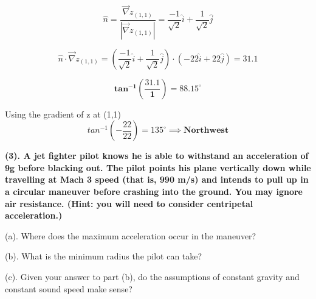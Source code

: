 \documentclass[12pt]{article}
\begin{document}
$$
\hat{n} = \frac{\vec{\nabla}z_{(1,1)}}{|\vec{\nabla}z_{(1,1)}|} = \frac{-1}{\sqrt{2}}\hat{i} + \frac{1}{\sqrt{2}}\hat{j}
$$

$$
\hat{n} \cdot \vec{\nabla}z_{(1,1)} = (\frac{-1}{\sqrt{2}}\hat{i} + \frac{1}{\sqrt{2}}\hat{j}) \cdot (-22\hat{i} + 22\hat{j}) = 31.1
$$


$$
\boldsymbol{tan^{-1}(\frac{31.1}{1}) = 88.15^{\circ}}
$$

Using the gradient of z at (1,1)
$$
tan^{-1}(-\frac{22}{22}) = 135^{\circ} \implies \boldsymbol{Northwest}
$$

\newpage
\textbf{
(3). A jet fighter pilot knows he is able to withstand an acceleration of 9g
before blacking out. The pilot points his plane vertically down while travelling at Mach 3 speed
(that is, 990 m/s) and intends to pull up in a circular maneuver before crashing into the ground.
You may ignore air resistance. (Hint: you will need to consider centripetal acceleration.)
}

\hfill \break

(a). Where does the maximum acceleration occur in the maneuver?

(b). What is the minimum radius the pilot can take?

(c). Given your answer to part (b), do the assumptions of constant gravity and constant
sound speed make sense?

\hfill \break
\hfill \break
\end{document}
